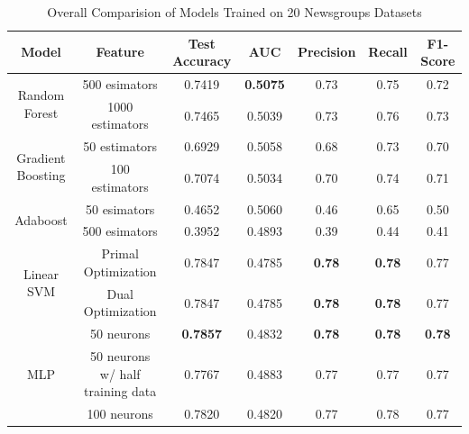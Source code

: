 \documentclass[twocolumn]{extarticle}
\begin{document}
\begin{appendices}
\begin{table}[h]
\centering
\caption{Overall Comparision of Models Trained on 20 Newsgroups Datasets}
\label{tab:20-news}
\begin{tabular}{@{}ccccccc@{}}
Model                              & Feature                          & Test Accuracy   & AUC             & Precision     & Recall        & F1-Score      \\ \midrule
\multirow{2}{*}{Random Forest}     & 500 esimators                    & 0.7419          & \textbf{0.5075} & 0.73          & 0.75          & 0.72          \\
                                   & 1000 estimators                  & 0.7465          & 0.5039          & 0.73          & 0.76          & 0.73          \\ \midrule
\multirow{2}{*}{Gradient Boosting} & 50 estimators                    & 0.6929          & 0.5058          & 0.68          & 0.73          & 0.70          \\
                                   & 100 estimators                   & 0.7074          & 0.5034          & 0.70          & 0.74          & 0.71          \\ \midrule
\multirow{2}{*}{Adaboost}          & 50 esimators                     & 0.4652          & 0.5060          & 0.46          & 0.65          & 0.50          \\
                                   & 500 esimators                    & 0.3952          & 0.4893          & 0.39          & 0.44          & 0.41          \\ \midrule
\multirow{2}{*}{Linear SVM}        & Primal Optimization              & 0.7847          & 0.4785          & \textbf{0.78} & \textbf{0.78} & 0.77          \\
                                   & Dual Optimization                & 0.7847          & 0.4785          & \textbf{0.78} & \textbf{0.78} & 0.77          \\ \midrule
\multirow{3}{*}{MLP}               & 50 neurons                       & \textbf{0.7857} & 0.4832          & \textbf{0.78} & \textbf{0.78} & \textbf{0.78} \\
                                   & 50 neurons w/ half training data & 0.7767          & 0.4883          & 0.77          & 0.77          & 0.77          \\
                                   & 100 neurons                      & 0.7820          & 0.4820          & 0.77          & 0.78          & 0.77         
\end{tabular}
\end{table}






\end{appendices}
\end{document}
